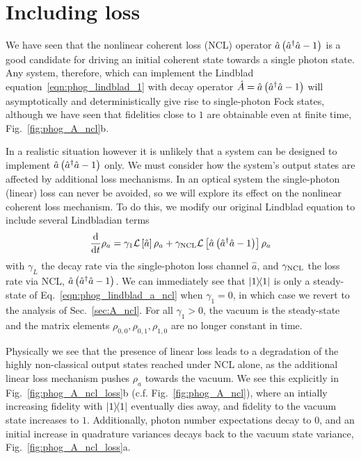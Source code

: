 \FloatBarrier
\section{Including loss}\label{sec:phog_including_loss}
We have seen that the nonlinear coherent loss (NCL) operator $\hat{a}\left(\hat{a}^\dagger \hat{a} - 1\right)$ is a good candidate for driving an initial coherent state towards a single photon state. Any system, therefore, which can implement the Lindblad equation~\ref{eqn:phog_lindblad_1} with decay operator $\hat{A} = \hat{a}\left(\hat{a}^\dagger \hat{a} - 1\right)$ will asymptotically and deterministically give rise to single-photon Fock states, although we have seen that fidelities close to $1$ are obtainable even at finite time, Fig.~\ref{fig:phog_A_ncl}b. 

In a realistic situation however it is unlikely that a system can be designed to implement $\hat{a}\left(\hat{a}^\dagger \hat{a} - 1\right)$ only. We must consider how the system's output states are affected by additional loss mechanisms. In an optical system the single-photon (linear) loss can never be avoided, so we will explore its effect on the nonlinear coherent loss mechanism. To do this, we modify our original Lindblad equation to include several Lindbladian terms
\begin{equation}\label{eqn:phog_lindblad_a_ncl}
\frac{\mathrm{d}}{\mathrm{d}t} \rho_a =  \gamma_1 \mathcal{L}\left[\hat{a}\right]\rho_a + \gamma_{\text{NCL}} \mathcal{L}\left[\hat{a}\left(\hat{a}^\dagger \hat{a} - 1\right)\right]\rho_a
\end{equation}
with $\gamma_L$ the decay rate via the single-photon loss channel $\hat{a}$, and $\gamma_{\text{NCL}}$ the loss rate via NCL, $\hat{a}\left(\hat{a}^\dagger \hat{a} - 1\right)$. We can immediately see that $\dyad{1}$ is only a steady-state of Eq.~\ref{eqn:phog_lindblad_a_ncl} when $\gamma_1 = 0$, in which case we revert to the analysis of Sec.~\ref{sec:A_ncl}. For all $\gamma_1 > 0$, the vacuum is the steady-state and the matrix elements $\rho_{0, 0}, \rho_{0, 1}, \rho_{1, 0}$ are no longer constant in time. 

Physically we see that the presence of linear loss leads to a degradation of the highly non-classical output states reached under NCL alone, as the additional linear loss mechanism pushes $\rho_a$ towards the vacuum. We see this explicitly in Fig.~\ref{fig:phog_A_ncl_loss}b (c.f. Fig.~\ref{fig:phog_A_ncl}), where an intially increasing fidelity with $\dyad{1}$ eventually dies away, and fidelity to the vacuum state increases to $1$. Additionally, photon number expectations decay to $0$, and an initial increase in quadrature variances decays back to the vacuum state variance, Fig.~\ref{fig:phog_A_ncl_loss}a.





